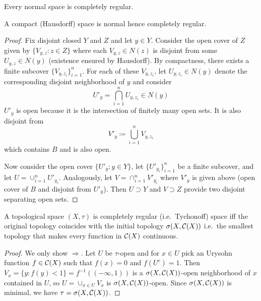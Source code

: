 \begin{corollary}
  Every normal space is completely regular.
\end{corollary}

\begin{lemma}
  A compact (Hausdorff) space is normal hence completely regular.
\end{lemma}

\begin{proof}
  Fix disjoint closed $Y$ and $Z$ and let $y \in Y$.
  Consider the open cover of $Z$ given by $\{ V_{y,z} : z \in Z \}$
  where each $V_{y,z} \in N(z)$ is disjoint from some $U_{y,z} \in N(y)$
  (existence ensured by Hausdorff). By compactness,
  there exists a finite subcover $\{V_{y,z_i}\}_{i=1}^n$. For each of these
  $V_{y,z_i}$, let $U_{y, z_i} \in N(y)$ denote the corresponding disjoint
  neighborhood of $y$ and consider
  \[
    U'_y = \bigcap_{i=1}^n U_{y, z_i} \in N(y)
  \]
  $U'_y$ is open because it is the intersection of finitely many open sets.
  It is also disjoint from
  \[
    V'_y \coloneqq \bigcup_{i=1}^n V_{y, z_i}
  \]
  which contains $B$ and is also open.

  Now consider the open cover $\{U'_y : y \in Y\}$,
  let $\{U'_{y_i}\}_{i=1}^n$ be a finite subcover,
  and let $U = \cup_{i=1}^n U'_{y_i}$. Analogously,
  let $V = \cap_{i=1}^n V'_{y_i}$ where $V'_y$ is
  given above (open cover of $B$ and disjoint from $U'_y$).
  Then $U \supset Y$ and $V \supset Z$ provide two disjoint
  separating open sets.
\end{proof}

\begin{lemma}
  \label{lem:completely-regular-equals-initial-topo-cts}
  A topological space $(X, \tau)$ is completely regular (i.e.\ Tychonoff) space
  iff the original topology coincides with the initial topology $\sigma(X,
  \mathcal{C}(X))$ i.e.\ the smallest topology that makes every function in $\mathcal{C}(X)$
  continuous.
\end{lemma}

\begin{proof}
  We only show $\Rightarrow$. Let $U$ be $\tau$-open and for $x \in U$
  pick an Urysohn function $f \in \mathcal{C}(X)$ such that $f(x) = 0$
  and $f(U^c) = 1$. Then $V_x = \{y : f(y) < 1\} = f^{-1}((-\infty, 1))$
  is a $\sigma(X, \mathcal{C}(X))$-open neighborhood of $x$ contained
  in $U$, so $U = \cup_{x \in U} V_x$ is $\sigma(X, \mathcal{C}(X))$-open.
  Since $\sigma(X, \mathcal{C}(X))$ is minimal, we have $\tau = \sigma(X, \mathcal{C}(X))$.
\end{proof}

